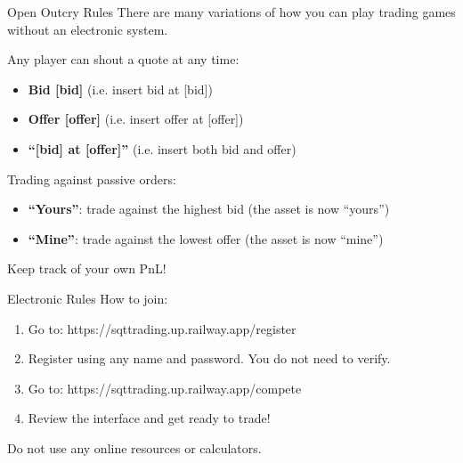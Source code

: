 \begin{frame}{Open Outcry Rules}
  There are many variations of how you can play trading games without an electronic system.

  Any player can shout a quote at any time:
  \begin{itemize}
    \item \textbf{Bid [bid]} (i.e. insert bid at [bid])
    \item \textbf{Offer [offer]} (i.e. insert offer at [offer])
    \item \textbf{``[bid] at [offer]''} (i.e. insert both bid and offer)
  \end{itemize}

  \vspace{0.3cm}
  Trading against passive orders:
  \begin{itemize}
    \item \textbf{``Yours''}: trade against the highest bid (the asset is now ``yours'')
    \item \textbf{``Mine''}: trade against the lowest offer (the asset is now ``mine'')
  \end{itemize}
  \textcolor{sqt-question}{Keep track of your own PnL!}
\end{frame}

\begin{frame}{Electronic Rules}
  How to join:
  \begin{enumerate}
    \item Go to: \textcolor{sqt-question}{https://sqttrading.up.railway.app/register}
    \item Register using any name and password. You do not need to verify.
    \item Go to: \textcolor{sqt-question}{https://sqttrading.up.railway.app/compete}
    \item Review the interface and get ready to trade!
  \end{enumerate}
  Do not use any online resources or calculators.
\end{frame}
